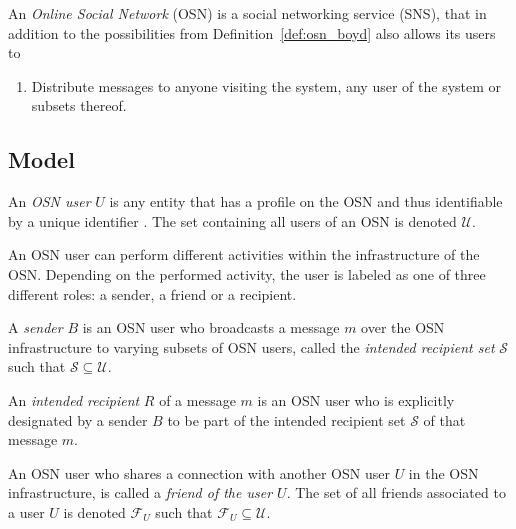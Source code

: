 \begin{defn}[OSN]
\label{def:osn}
 An \textit{Online Social Network} (OSN) is a social networking service (SNS), that in addition to the possibilities from Definition~\ref{def:osn_boyd} also allows its users to
 \begin{enumerate}
  \setcounter{enumi}{\theenumTemp}
  \item Distribute messages to anyone visiting the system, any user of the system or subsets thereof.
 \end{enumerate}
\end{defn}


\subsection{Model}

\begin{defn}
\label{def:user}
 An \textit{OSN user} $U$ is any entity that has a profile on the OSN and thus identifiable by a unique identifier . The set containing all users of an OSN is denoted $\mathcal{U}$.
\end{defn}

An OSN user can perform different activities within the infrastructure of the OSN. Depending on the performed activity, the user is labeled as one of three different roles: a sender, a friend or a recipient.

\begin{defn}[Sender]
\label{def:sender}
 A \textit{sender} $B$ is an OSN user who broadcasts a message $m$ over the OSN infrastructure to varying subsets of OSN users, called the \textit{intended recipient set} $\mathcal{S}$ such that $\mathcal{S} \subseteq \mathcal{U}$.
\end{defn}

\begin{defn}
\label{def:recipient}
 An \textit{intended recipient} $R$ of a message $m$ is an OSN user who is explicitly designated by a sender $B$ to be part of the intended recipient set $\mathcal{S}$ of that message $m$.
\end{defn}

\begin{defn}[Friend]
\label{def:friend}
 An OSN user who shares a connection with another OSN user $U$ in the OSN infrastructure, is called a \textit{friend of the user $U$}. The set of all friends associated to a user $U$ is denoted $\mathcal{F}_U$ such that $\mathcal{F}_U \subseteq \mathcal{U}$.
\end{defn}

